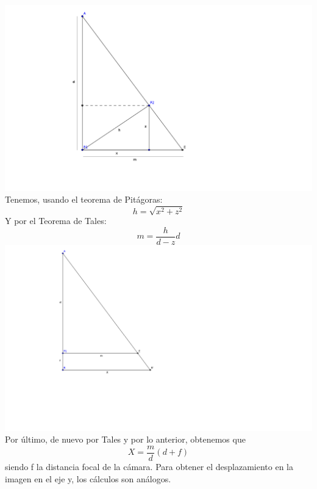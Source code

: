 \documentclass[a4paper,openright, 12pt]{book}
\begin{document}
\includegraphics{tales1}
\newpage
Tenemos, usando el teorema de Pitágoras:
\begin{equation*}
h=\sqrt{x^2 + z^2}
\end{equation*}
Y por el Teorema de Tales:
\begin{equation*}
m = \dfrac{h}{d-z}d
\end{equation*}
\includegraphics{tales2}
Por último, de nuevo por Tales y por lo anterior, obtenemos que
\begin{equation*}
X=\dfrac{m}{d}(d+f)
\end{equation*}
siendo f la distancia focal de la cámara.
Para obtener el desplazamiento en la imagen en el eje y, los cálculos son análogos.
\newpage
\end{document}
